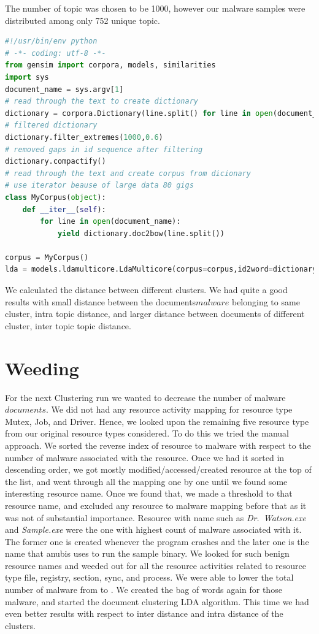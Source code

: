 The number of topic was chosen to be 1000, however our malware samples were distributed among only 752 unique topic.
\begin{lstlisting}[language=python,caption={Script to run Gensim LDA},label={lbl:lda.py}]
#!/usr/bin/env python
# -*- coding: utf-8 -*-
from gensim import corpora, models, similarities
import sys
document_name = sys.argv[1]
# read through the text to create dictionary
dictionary = corpora.Dictionary(line.split() for line in open(document_name))
# filtered dictionary
dictionary.filter_extremes(1000,0.6)
# removed gaps in id sequence after filtering
dictionary.compactify()
# read through the text and create corpus from dicionary
# use iterator beause of large data 80 gigs
class MyCorpus(object):
    def __iter__(self):
        for line in open(document_name):
            yield dictionary.doc2bow(line.split())

corpus = MyCorpus()
lda = models.ldamulticore.LdaMulticore(corpus=corpus,id2word=dictionary,num_topics=700)
\end{lstlisting}
We calculated the distance between different clusters. We had quite a good results with small distance between the documents\(malware\) belonging to same cluster, intra topic distance, and larger distance between documents of different cluster, inter topic topic distance.
\section{Weeding}
\label{sec:Weeding}
For the next Clustering run we wanted to decrease the number of malware\(documents\).
We did not had any resource activity mapping for resource type Mutex, Job, and Driver. Hence, we looked upon the remaining five resource type from our original resource types considered.
To do this we tried the manual approach. We sorted the reverse index of resource to malware with respect to the number of malware associated with the resource.
Once we had it sorted in descending order, we got mostly modified/accessed/created resource at the top of the list, and went through all the mapping one by one until we found some interesting resource name. Once we found that, we made a threshold to that resource name, and excluded any resource to malware mapping before that as it was not of substantial importance.
Resource with name such as \emph{Dr.\ Watson.exe} and \emph{Sample.exe} were the one with highest count of malware associated with it. The former one is created whenever the program crashes and the later one is the name that anubis uses to run the sample binary.
We looked for such benign resource names and weeded out for all the resource activities related to resource type file, registry, section, sync, and process. We were able to lower the total number of malware from {\gettotalmalwareii{}} to {\gettotalmalwareiii{}}.
We created the bag of words again for those {\gettotalmalwareiii{}} malware, and started the document clustering LDA algorithm. This time we had even better results with respect to inter distance and intra distance of the clusters.
